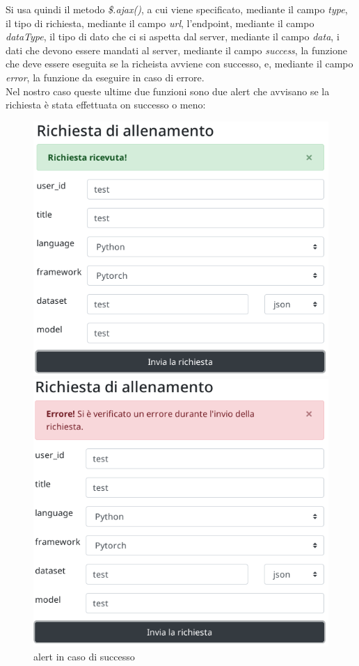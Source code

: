 \documentclass[a4paper,12pt, oneside]{book}
\begin{document}
Si usa quindi il metodo \textit{\$.ajax()}, a cui viene specificato, mediante il campo
\textit{type}, il tipo di richiesta, mediante il campo \textit{url}, l'endpoint,
mediante il campo \textit{dataType}, il tipo di dato che ci si aspetta dal server,
mediante il campo \textit{data}, i dati che devono essere mandati al server, mediante il campo \textit{success}, la funzione che deve essere eseguita
se la richeista avviene con successo, e, mediante il campo \textit{error}, la funzione da eseguire in caso di errore.\\
Nel nostro caso queste ultime due funzioni sono due alert che avvisano se la richiesta è stata effettuata on successo o meno:
\begin{figure}[H]
\centering
\begin{minipage}{.5\textwidth}
  \centering
  \includegraphics[scale = 0.42]{img/good-form.png}
  \caption{alert in caso di successo}
\end{minipage}%
\begin{minipage}{.5\textwidth}
  \centering
  \includegraphics[scale = 0.4]{img/bad-form.png}

\end{minipage}
\end{figure}
\end{document}
